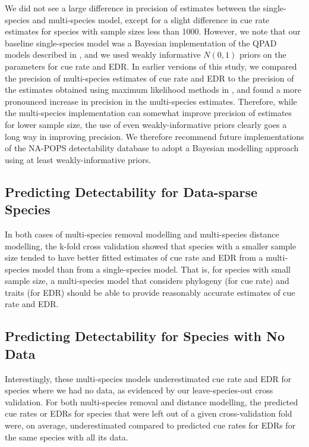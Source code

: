 \documentclass[12pt]{article}
\begin{document}
\par We did not see a large difference in precision of estimates between the single-species and multi-species model, except for a slight difference in cue rate estimates for species with sample sizes less than 1000.
However, we note that our baseline single-species model was a Bayesian implementation of the QPAD models described in \citet{solymos_calibrating_2013}, and we used weakly informative $N(0,1)$ priors on the parameters for cue rate and EDR.
In earlier versions of this study, we compared the precision of multi-species estimates of cue rate and EDR to the precision of the estimates obtained using maximum likelihood methods in \citet{edwards_point_2023}, and found a more pronounced increase in precision in the multi-species estimates.
Therefore, while the multi-species implementation can somewhat improve precision of estimates for lower sample size, the use of even weakly-informative priors clearly goes a long way in improving precision.
We therefore recommend future implementations of the NA-POPS detectability database to adopt a Bayesian modelling approach using at least weakly-informative priors.

\subsection{Predicting Detectability for Data-sparse Species}

\par In both cases of multi-species removal modelling and multi-species distance modelling, the k-fold cross validation showed that species with a smaller sample size tended to have better fitted estimates of cue rate and EDR from a multi-species model than from a single-species model.
That is, for species with small sample size, a multi-species model that considers phylogeny (for cue rate) and traits (for EDR) should be able to provide reasonably accurate estimates of cue rate and EDR.

\subsection{Predicting Detectability for Species with No Data}\label{discussion-nodata}

\par Interestingly, these multi-species models underestimated cue rate and EDR for species where we had no data, as evidenced by our leave-species-out cross validation.
For both multi-species removal and distance modelling, the predicted cue rates or EDRs for species that were left out of a given cross-validation fold were, on average, underestimated compared to predicted cue rates for EDRs for the same species with all its data.
\end{document}
